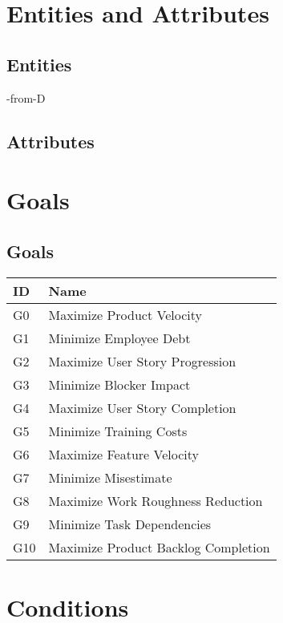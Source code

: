 \documentclass{article}
\begin{document}
\section{Entities and Attributes}
\subsection{Entities}
\begin{mermaid}
       
     -from-D
\end{mermaid}

\subsection{Attributes}
\begin{mermaid}
      
\end{mermaid}

\section{Goals}
\subsection{Goals}
\begin{tabular}{|l|l|}
\hline
ID & Name \\
\hline
G0 & Maximize Product Velocity \\
G1 & Minimize Employee Debt \\
G2 & Maximize User Story Progression \\
G3 & Minimize Blocker Impact \\
G4 & Maximize User Story Completion \\
G5 & Minimize Training Costs \\
G6 & Maximize Feature Velocity \\
G7 & Minimize Misestimate \\
G8 & Maximize Work Roughness Reduction \\
G9 & Minimize Task Dependencies \\
G10 & Maximize Product Backlog Completion \\
\hline
\end{tabular}

\section{Conditions}
\end{document}
